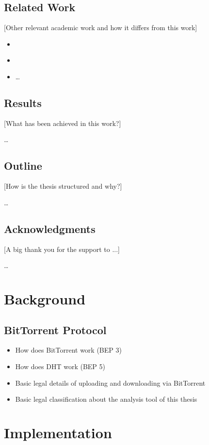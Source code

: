 \documentclass[10pt, a4paper]{scrartcl} %
\renewcommand{\_}{\origunderscore\allowbreak}
\begin{document}
\subsection{Related Work}
[Other relevant academic work and how it differs from this work]

\begin{itemize}
  \item \cite{watters2011much}
  \item \cite{drachen2011distribution}
  \item \dots
\end{itemize}

\subsection{Results}
[What has been achieved in this work?]

\dots

\subsection{Outline}
[How is the thesis structured and why?]

\dots

\subsection{Acknowledgments}
[A big thank you for the support to ...]

\dots

\section{Background}
\subsection{BitTorrent Protocol}
\begin{itemize}
  \item How does BitTorrent work (BEP 3)
  \item How does DHT work (BEP 5)
  \item Basic legal details of uploading and downloading via BitTorrent
  \item Basic legal classification about the analysis tool of this thesis
\end{itemize}

\section{Implementation}
\end{document}
